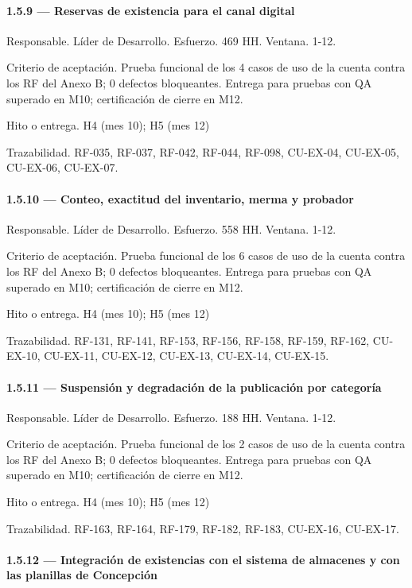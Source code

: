 \documentclass[11pt]{article}
\begin{document}
\paragraph{1.5.9 — Reservas de existencia para el canal digital}

Responsable. Líder de Desarrollo. Esfuerzo. 469 HH. Ventana. 1-12.

Criterio de aceptación. Prueba funcional de los 4 casos de uso de la cuenta contra los RF del Anexo B; 0 defectos bloqueantes. Entrega para pruebas con QA superado en M10; certificación de cierre en M12.

Hito o entrega. H4 (mes 10); H5 (mes 12)

Trazabilidad. RF-035, RF-037, RF-042, RF-044, RF-098, CU-EX-04, CU-EX-05, CU-EX-06, CU-EX-07.

\paragraph{1.5.10 — Conteo, exactitud del inventario, merma y probador}

Responsable. Líder de Desarrollo. Esfuerzo. 558 HH. Ventana. 1-12.

Criterio de aceptación. Prueba funcional de los 6 casos de uso de la cuenta contra los RF del Anexo B; 0 defectos bloqueantes. Entrega para pruebas con QA superado en M10; certificación de cierre en M12.

Hito o entrega. H4 (mes 10); H5 (mes 12)

Trazabilidad. RF-131, RF-141, RF-153, RF-156, RF-158, RF-159, RF-162, CU-EX-10, CU-EX-11, CU-EX-12, CU-EX-13, CU-EX-14, CU-EX-15.

\paragraph{1.5.11 — Suspensión y degradación de la publicación por categoría}

Responsable. Líder de Desarrollo. Esfuerzo. 188 HH. Ventana. 1-12.

Criterio de aceptación. Prueba funcional de los 2 casos de uso de la cuenta contra los RF del Anexo B; 0 defectos bloqueantes. Entrega para pruebas con QA superado en M10; certificación de cierre en M12.

Hito o entrega. H4 (mes 10); H5 (mes 12)

Trazabilidad. RF-163, RF-164, RF-179, RF-182, RF-183, CU-EX-16, CU-EX-17.

\paragraph{1.5.12 — Integración de existencias con el sistema de almacenes y con las planillas de Concepción}
\end{document}
